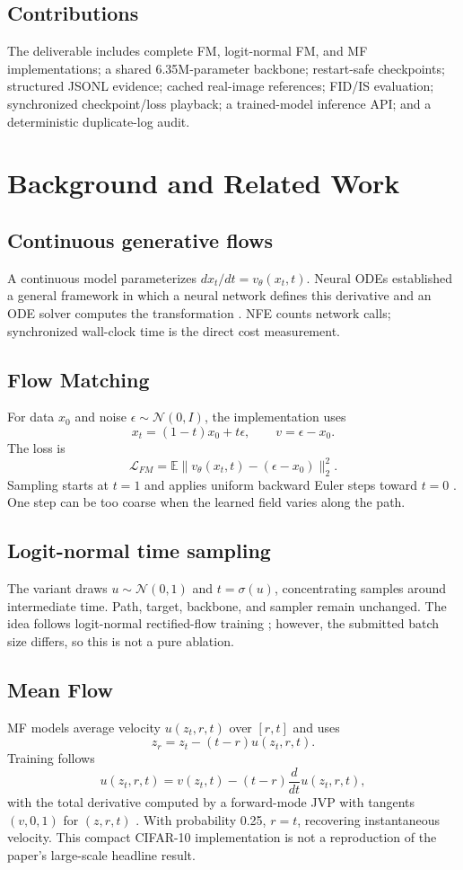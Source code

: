 \documentclass{iutbscthesis}
\begin{document}
\section{Contributions}
The deliverable includes complete FM, logit-normal FM, and MF implementations; a shared 6.35M-parameter backbone; restart-safe checkpoints; structured JSONL evidence; cached real-image references; FID/IS evaluation; synchronized checkpoint/loss playback; a trained-model inference API; and a deterministic duplicate-log audit.

\chapter{Background and Related Work}
\section{Continuous generative flows}
A continuous model parameterizes $dx_t/dt=v_\theta(x_t,t)$. Neural ODEs established a general framework in which a neural network defines this derivative and an ODE solver computes the transformation \cite{chen2018neural}. NFE counts network calls; synchronized wall-clock time is the direct cost measurement.
\section{Flow Matching}
For data $x_0$ and noise $\epsilon\sim\mathcal N(0,I)$, the implementation uses
\begin{equation}x_t=(1-t)x_0+t\epsilon,\qquad v=\epsilon-x_0.\end{equation}
The loss is
\begin{equation}\mathcal L_{FM}=\mathbb E\|v_\theta(x_t,t)-(\epsilon-x_0)\|_2^2.\end{equation}
Sampling starts at $t=1$ and applies uniform backward Euler steps toward $t=0$ \cite{lipman2023flow}. One step can be too coarse when the learned field varies along the path.
\section{Logit-normal time sampling}
The variant draws $u\sim\mathcal N(0,1)$ and $t=\sigma(u)$, concentrating samples around intermediate time. Path, target, backbone, and sampler remain unchanged. The idea follows logit-normal rectified-flow training \cite{esser2024scaling}; however, the submitted batch size differs, so this is not a pure ablation.
\section{Mean Flow}
MF models average velocity $u(z_t,r,t)$ over $[r,t]$ and uses
\begin{equation}z_r=z_t-(t-r)u(z_t,r,t).\end{equation}
Training follows
\begin{equation}u(z_t,r,t)=v(z_t,t)-(t-r)\frac{d}{dt}u(z_t,r,t),\end{equation}
with the total derivative computed by a forward-mode JVP with tangents $(v,0,1)$ for $(z,r,t)$ \cite{geng2025mean}. With probability 0.25, $r=t$, recovering instantaneous velocity. This compact CIFAR-10 implementation is not a reproduction of the paper's large-scale headline result.
\end{document}
